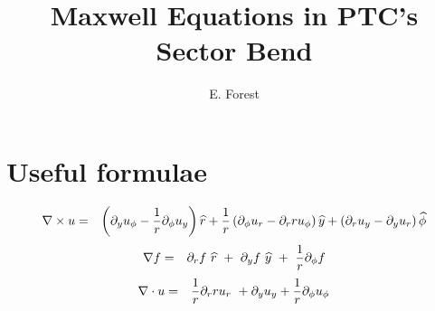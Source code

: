 \documentclass[11pt]{article} %
\title{Maxwell Equations  in PTC's Sector Bend}
\author{E. Forest}
\begin{document}
\maketitle

\section{Useful formulae}
%
%
\begin{eqnarray}\nabla \times u&=
& \left({{\partial }_{y}{u}_{\phi }-{1 \over r}{\partial }_{\phi }{u}_{y}}\right)\widehat{r}+{1 \over r}\left({{\partial }_{\phi }{u}_{r}-{\partial }_{r}r{u}_{\phi }}\right)\widehat{y}+\left({{\partial }_{r}{u}_{y}-{\partial }_{y}{u}_{r}}\right)\widehat{\phi }\end{eqnarray}
%
%
\begin{eqnarray}\nabla f &=
& {\partial }_{r}f\ \widehat{r}\ +\ {\partial }_{y}f\ \widehat{y}\ +\ {1 \over r}{\partial }_{\phi }f\end{eqnarray}
%
%
\begin{eqnarray}\nabla \cdot u&=
& {1 \over r}{\partial }_{r}r{u}_{r}\ +{\partial }_{y}{u}_{y}+{1 \over r}{\partial }_{\phi }{u}_{\phi }\end{eqnarray}
%
\end{document}
